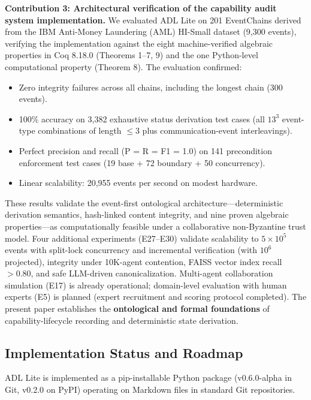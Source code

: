 \textbf{Contribution 3: Architectural verification of the capability audit system implementation.} We evaluated ADL Lite on 201 EventChains derived from the IBM Anti-Money Laundering (AML) HI-Small dataset (9,300 events), verifying the implementation against the eight machine-verified algebraic properties in Coq 8.18.0 (Theorems 1--7, 9) and the one Python-level computational property (Theorem 8). The evaluation confirmed:
\begin{itemize}[leftmargin=2em]
    \item Zero integrity failures across all chains, including the longest chain (300 events).
    \item 100\% accuracy on 3,382 exhaustive status derivation test cases (all $13^3$ event-type combinations of length $\leq 3$ plus communication-event interleavings).
    \item Perfect precision and recall (P = R = F1 = 1.0) on 141 precondition enforcement test cases (19 base + 72 boundary + 50 concurrency).
    \item Linear scalability: 20{,}955 events per second on modest hardware.
\end{itemize}
These results validate the event-first ontological architecture---deterministic derivation semantics, hash-linked content integrity, and nine proven algebraic properties---as computationally feasible under a collaborative non-Byzantine trust model. Four additional experiments (E27--E30) validate scalability to $5\times10^5$ events with split-lock concurrency and incremental verification (with $10^6$ projected), integrity under 10K-agent contention, FAISS vector index recall ${>}0.80$, and safe LLM-driven canonicalization. Multi-agent collaboration simulation (E17) is already operational; domain-level evaluation with human experts (E5) is planned (expert recruitment and scoring protocol completed). The present paper establishes the \textbf{ontological and formal foundations} of capability-lifecycle recording and deterministic state derivation.

\subsection{Implementation Status and Roadmap}\label{subsec:roadmap}

ADL Lite is implemented as a pip-installable Python package (v0.6.0-alpha in Git, v0.2.0 on PyPI) operating on Markdown files in standard Git repositories.


